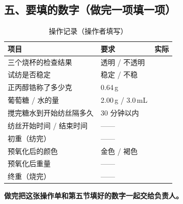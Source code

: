 \subsection*{五、要填的数字（做完一项填一项）}
\begin{table}[htbp]
\centering
\caption{操作记录（操作者填写）}
\begin{tabularx}{\textwidth}{X p{3.2cm} p{3.2cm}}
\toprule
\textbf{项目} & \textbf{要求} & \textbf{实际} \\
\midrule
三个烧杯的检查结果 & 透明 / 不透明 & \\
试纺是否稳定 & 稳定 / 不稳 & \\
正丙醇锆称了多少克 & 0.64\,g & \\
葡萄糖 / 水的量 & 2.00\,g / 3.0\,mL & \\
搅完糖水到开始纺丝隔多久 & 30 分钟以内 & \\
纺丝开始时间 / 结束时间 & —— & \\
初重（纺完） & —— & \\
预氧化后的颜色 & 金色 / 褐色 & \\
预氧化后重量 & —— & \\
终重（烧完） & —— & \\
\bottomrule
\end{tabularx}
\end{table}

\noindent\textbf{做完把这张操作单和第五节填好的数字一起交给负责人。}
